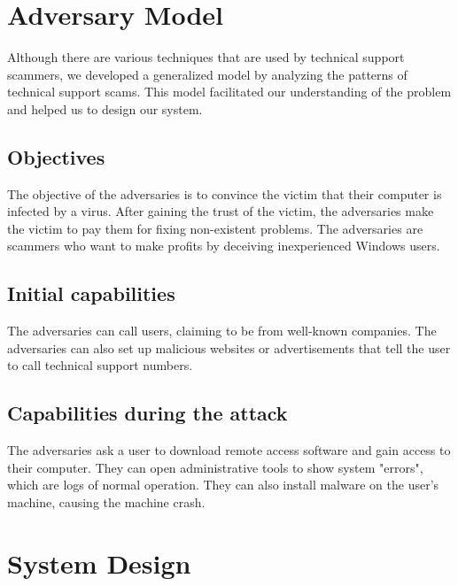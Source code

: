 \documentclass[final]{IEEEtran}
\begin{document}
\section{Adversary Model} %
Although there are various techniques that are used by technical support scammers, we developed a generalized model by analyzing the patterns of technical support scams. This model facilitated our understanding of the problem and helped us to design our system.
\subsection{Objectives}
The objective of the adversaries is to convince the victim that their computer is infected by a virus. After gaining the trust of the victim, the adversaries make the victim to pay them for fixing non-existent problems. The adversaries are scammers who want to make profits by deceiving inexperienced Windows users.
\subsection{Initial capabilities}
The adversaries can call users, claiming to be from well-known companies. The adversaries can also set up malicious websites or advertisements that tell the user to call technical support numbers. 
\subsection{Capabilities during the attack}
The adversaries ask a user to download remote access software and gain access to their computer. They can open administrative tools to show system "errors", which are logs of normal operation. They can also install malware on the user's machine, causing the machine crash.

\section{System Design} %
\end{document}
